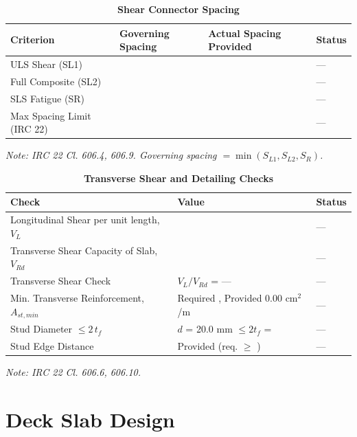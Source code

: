 \documentclass[12pt,a4paper]{report}
\numberwithin{table}{chapter}
\numberwithin{figure}{chapter}
\begin{document}
\vspace{1em}

\setlength\LTleft{0pt}
\setlength\LTright{\fill}

\begin{longtable}{|L{3.2cm}|>{\centering\arraybackslash}p{4.3cm}|>{\centering\arraybackslash}p{4.3cm}|C{2.0cm}|}
\caption{\textbf{Shear Connector Spacing}}
\hline
\textbf{Criterion} & \textbf{Governing Spacing} & \textbf{Actual Spacing Provided} & \textbf{Status} \\[6pt]
\hline
ULS Shear (SL1) &  &  & --- \\[6pt]
\hline
Full Composite (SL2) &  &  & --- \\[6pt]
\hline
SLS Fatigue (SR) &  &  & --- \\[6pt]
\hline
Max Spacing Limit (IRC 22) &  &  & --- \\[6pt]
\hline
\end{longtable}
\noindent\textit{Note: IRC 22 Cl. 606.4, 606.9. Governing spacing $= \min(S_{L1}, S_{L2}, S_R)$.}

\vspace{1em}
\begin{longtable}{|L{5.3cm}|>{\arraybackslash}p{7.2cm}|C{2.0cm}|}
\caption{\textbf{Transverse Shear and Detailing Checks}}
\hline
\textbf{Check} & \textbf{Value} & \textbf{Status} \\[6pt]
\hline
\textnormal{Longitudinal Shear per unit length, $V_L$} &  & --- \\[6pt]
\hline
\textnormal{Transverse Shear Capacity of Slab, $V_{Rd}$} &  & --- \\[6pt]
\hline
\textnormal{Transverse Shear Check} & $V_L/V_{Rd}$ = --- & --- \\[6pt]
\hline
\textnormal{Min. Transverse Reinforcement, $A_{st,min}$} & Required , Provided 0.00 cm$^2$/m & --- \\[6pt]
\hline
\textnormal{Stud Diameter $\leq 2\,t_f$} & $d$ = 20.0 mm $\leq 2t_f$ =  & --- \\[6pt]
\hline
\textnormal{Stud Edge Distance} & Provided  (req. $\geq$ ) & --- \\[6pt]
\hline
\end{longtable}
\noindent\textit{Note: IRC 22 Cl. 606.6, 606.10.}

\section{Deck Slab Design}
\label{sec:deck-design}
\end{document}
